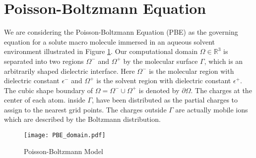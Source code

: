 \section{Poisson-Boltzmann Equation}
We are considering the Poisson-Boltzmann Equation (PBE) as the governing equation for a solute macro molecule immersed in an aqueous solvent environment illustrated in Figure \ref{fig_PBmodel}. Our computational domain $\Omega \in \mathbb{R}^3$ is separated into two regions $\Omega^-$ and $\Omega^+$ by the molecular surface $\Gamma$, which is an arbitrarily shaped dielectric interface. Here $\Omega^-$ is the molecular region with dielectric constant $\epsilon^-$ and $\Omega^+$ is the solvent region with dielectric constant $\epsilon^+$. The cubic shape boundary of $\Omega= \Omega^-\cup \Omega^+ $ is denoted by $\partial \Omega$. The charges at the center of each atom. inside $\Gamma$, have been distributed as the partial charges to assign to the nearest grid points. The charges outside $\Gamma$ are actually mobile ions which are described by the Boltzmann distribution. 

\begin{figure}[!ht]
\centering
	\texttt{[image: PBE\_domain.pdf]}
	\caption{Poisson-Boltzmann Model}
	\label{fig_PBmodel}
\end{figure}

